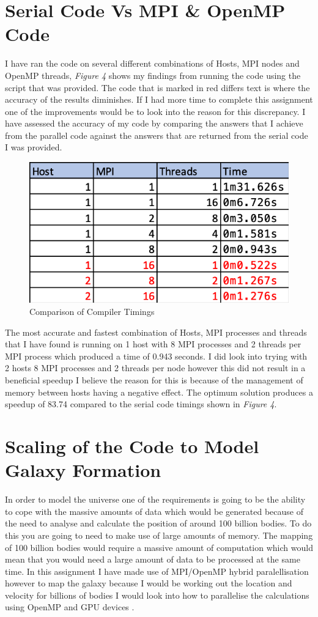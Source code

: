 \documentclass[a4paper, twoside, 11pt]{article}
\begin{document}
\section{Serial Code Vs MPI \& OpenMP Code}
I have ran the code on several different combinations of Hosts, MPI nodes and OpenMP threads, \textit{Figure 4} shows my findings from running the code using the script that was provided. The code that is marked in red differs text is where the accuracy of the results diminishes. If I had more time to complete this assignment one of the improvements would be to look into the reason for this discrepancy. I have assessed the accuracy of my code by comparing the answers that I achieve from the parallel code against the answers that are returned from the serial code I was provided. 

\begin{figure}[H]
	\centering
	\includegraphics[scale=0.6]{images/compilerTimings}
	\caption{Comparison of Compiler Timings}
\end{figure}
 
 The most accurate and fastest combination of Hosts, MPI processes and threads that I have found is running on 1 host with 8 MPI processes and 2 threads per MPI process which produced a time of 0.943 seconds. I did look into trying with 2 hosts 8 MPI processes and 2 threads per node however this did not result in a beneficial speedup I believe the reason for this is because of the management of memory between hosts having a negative effect. The optimum solution produces a speedup of 83.74 compared to the serial code timings shown in \textit{Figure 4}.
 
\section{Scaling of the Code to Model Galaxy Formation}
In order to model the universe one of the requirements is going to be the ability to cope with the massive amounts of data which would be generated because of the need to analyse and calculate the position of around 100 billion bodies. To do this you are going to need to make use of large amounts of memory. The mapping of 100 billion bodies would require a massive amount of computation which would mean that you would need a large amount of data to be processed at the same time. In this assignment I have made use of MPI/OpenMP hybrid paralellisation however to map the galaxy because I would be working out the location and velocity for billions of bodies I would look into how to parallelise the calculations using OpenMP and GPU devices .
\end{document}
